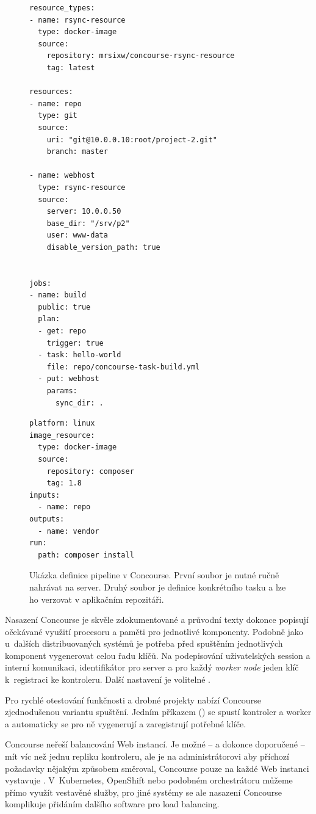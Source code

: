         \begin{figure}[H]
            \centering
                \begin{verbatim}
resource_types:
- name: rsync-resource
  type: docker-image
  source:
    repository: mrsixw/concourse-rsync-resource
    tag: latest

resources:
- name: repo
  type: git
  source:
    uri: "git@10.0.0.10:root/project-2.git"
    branch: master

- name: webhost
  type: rsync-resource
  source:
    server: 10.0.0.50
    base_dir: "/srv/p2"
    user: www-data
    disable_version_path: true


jobs:
- name: build
  public: true
  plan:
  - get: repo
    trigger: true
  - task: hello-world
    file: repo/concourse-task-build.yml
  - put: webhost
    params:
      sync_dir: .
                \end{verbatim}
                \begin{verbatim}
platform: linux
image_resource:
  type: docker-image
  source:
    repository: composer
    tag: 1.8
inputs:
  - name: repo
outputs:
  - name: vendor
run:
  path: composer install
\end{verbatim}
            \caption{Ukázka definice pipeline v Concourse. První soubor je nutné ručně nahrávat na server. Druhý soubor je definice konkrétního tasku a lze ho verzovat v aplikačním repozitáři.}
        \end{figure}

        \newpage
        Nasazení Concourse je skvěle zdokumentované a průvodní texty dokonce popisují očekávané využití procesoru a paměti pro jednotlivé komponenty. Podobně jako u~dalších distribuovaných systémů je potřeba před spuštěním jednotlivých komponent vygenerovat celou řadu klíčů. Na podepisování uživatelských session a interní komunikaci, identifikátor pro  server a pro každý \textit{worker node} jeden klíč k~registraci ke kontroleru. Další nastavení je volitelné .

        Pro rychlé otestování funkčnosti a drobné projekty nabízí Concourse zjednodušenou variantu spuštění. Jedním příkazem () se spustí kontroler a worker a automaticky se pro ně vygenerují a zaregistrují potřebné klíče.

        Concourse neřeší balancování Web instancí. Je možné -- a dokonce doporučené -- mít víc než jednu repliku kontroleru, ale je na administrátorovi aby příchozí požadavky nějakým způsobem směroval, Concourse pouze na každé Web instanci vystavuje  . V~Kubernetes, OpenShift nebo podobném orchestrátoru můžeme přímo využít vestavěné služby, pro jiné systémy se ale nasazení Concourse komplikuje přidáním dalšího software pro load balancing.

